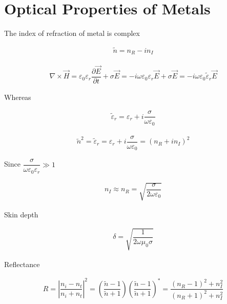 \section{Optical Properties of Metals}

The index of refraction of metal is complex

\begin{equation*}
  \begin{aligned}
    \tilde{n} = n_R - i n_I
  \end{aligned}
\end{equation*}

\begin{equation*}
  \begin{aligned}
    \nabla \times \vec{H} = \varepsilon_0 \varepsilon_r \dfrac{\partial \vec{E}}{\partial t} + \sigma \vec{E} = - i \omega \varepsilon_0 \varepsilon_r \vec{E} + \sigma \vec{E} = - i \omega \varepsilon_0 \tilde{\varepsilon}_r \vec{E}
  \end{aligned}
\end{equation*}

Whereas

\begin{equation*}
  \begin{aligned}
    \tilde{\varepsilon}_r = \varepsilon_r + i \dfrac{\sigma}{\omega \varepsilon_0} 
  \end{aligned}
\end{equation*}

\begin{equation*}
  \begin{aligned}
    \tilde{n}^2 = \tilde{\varepsilon}_r = \varepsilon_r + i \dfrac{\sigma}{\omega \varepsilon_0} = \left( n_R + i n_I \right)^2
  \end{aligned}
\end{equation*}

Since $\dfrac{\sigma}{\omega \varepsilon_0 \varepsilon_r} \gg 1 $

\begin{equation*}
  \begin{aligned}
    n_I \approx n_R = \sqrt{\dfrac{\sigma}{2 \omega \varepsilon_0} }
  \end{aligned}
\end{equation*}

Skin depth

\begin{equation*}
  \begin{aligned}
    \delta = \sqrt{\dfrac{1}{2 \omega \mu_0 \sigma} }
  \end{aligned}
\end{equation*}

Reflectance

\begin{equation*}
  \begin{aligned}
    R = \left| \dfrac{n_i - n_t}{n_i + n_t}  \right|^2 = \left( \dfrac{\tilde{n} - 1}{\tilde{n} + 1}  \right) \left( \dfrac{\tilde{n} - 1}{\tilde{n} + 1}  \right)^{*} = \dfrac{\left( n_R - 1 \right)^2 + n_I^2}{\left( n_R + 1 \right)^2 + n_I^2} 
  \end{aligned}
\end{equation*}

